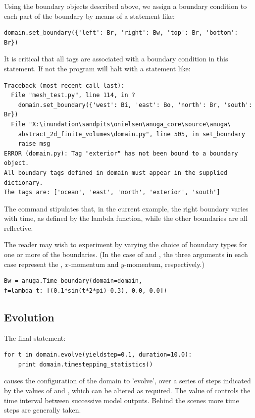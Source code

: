 \documentclass{manual}
\begin{document}
Using the boundary objects described above, we assign a boundary
condition to each part of the boundary by means of a statement like:

\begin{verbatim}
domain.set_boundary({'left': Br, 'right': Bw, 'top': Br, 'bottom': Br})
\end{verbatim}

It is critical that all tags are associated with a boundary condition in this statement.
If not the program will halt with a statement like:

\begin{verbatim}
Traceback (most recent call last):
  File "mesh_test.py", line 114, in ?
    domain.set_boundary({'west': Bi, 'east': Bo, 'north': Br, 'south': Br})
  File "X:\inundation\sandpits\onielsen\anuga_core\source\anuga\
    abstract_2d_finite_volumes\domain.py", line 505, in set_boundary
    raise msg
ERROR (domain.py): Tag "exterior" has not been bound to a boundary object.
All boundary tags defined in domain must appear in the supplied dictionary.
The tags are: ['ocean', 'east', 'north', 'exterior', 'south']
\end{verbatim}

The command  stipulates that, in the current example, the right
boundary varies with time, as defined by the lambda function, while the other
boundaries are all reflective.

The reader may wish to experiment by varying the choice of boundary
types for one or more of the boundaries. (In the case of \code{Bd}
and \code{Bw}, the three arguments in each case represent the
, $x$-momentum and $y$-momentum, respectively.)

\begin{verbatim}
Bw = anuga.Time_boundary(domain=domain, 
f=lambda t: [(0.1*sin(t*2*pi)-0.3), 0.0, 0.0])
\end{verbatim}

\subsection{Evolution}

The final statement: 

\begin{verbatim}
for t in domain.evolve(yieldstep=0.1, duration=10.0):
    print domain.timestepping_statistics()
\end{verbatim}

causes the configuration of the domain to 'evolve', over a series of
steps indicated by the values of  and
, which can be altered as required.  The value of
\code{yieldstep} controls the time interval between successive model
outputs.  Behind the scenes more time steps are generally taken.
\end{document}
